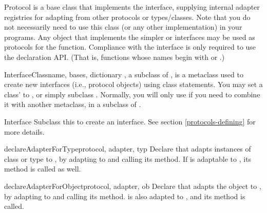 \begin{verbatim%
}
\begin{verbatim%
}
\begin{verbatim%
}
\begin{verbatim%
}
\begin{classdesc*}{Protocol}
 is a base class that implements the 
interface, supplying internal adapter registries for adapting from other
protocols or types/classes.  Note that you do not necessarily need to use this
class (or any other  implementation) in
your programs.  Any object that implements the simpler  or
 interfaces may be used as protocols for the
 function.  Compliance with the 
interface is only required to use the  declaration API.
(That is, functions whose names begin with  or .)
\end{classdesc*}


\begin{classdesc}{InterfaceClass}{name, bases, dictionary}
, a subclass of , is a metaclass used to
create new interfaces (i.e., protocol objects) using class statements.  You
may set a class'  to , or simply
subclass .  Normally, you will only use 
if you need to combine it with another metaclass, in a subclass of
.
\end{classdesc}


\begin{classdesc*}{Interface}
Subclass this to create an interface.  See section \ref{protocols-defining}
for more details.
\end{classdesc*}














\begin{funcdesc}{declareAdapterForType}{protocol, adapter, typ }
Declare that  adapts instances of class or type 
to , by adapting  to  and
calling its  method.  If  is adaptable
to , its  method is
called as well.
\end{funcdesc}

\begin{funcdesc}{declareAdapterForObject}{protocol, adapter, ob }
Declare that  adapts the object  to , by
adapting  to  and calling its
 method.   is also adapted to
, and its  method is called.
\end{funcdesc}


\end{verbatim%
}
\end{verbatim%
}
\end{verbatim%
}
\end{verbatim%
}
